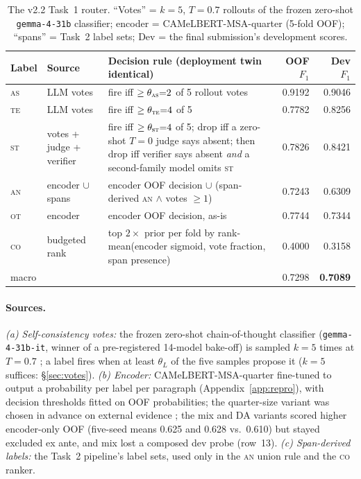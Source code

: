 \documentclass[11pt]{article}
\newcommand{\lab}[1]{\textsc{#1}}
\newcommand{\co}{\lab{co}}
\newcommand{\as}{\lab{as}}
\newcommand{\te}{\lab{te}}
\newcommand{\st}{\lab{st}}
\newcommand{\an}{\lab{an}}
\newcommand{\ot}{\lab{ot}}
\begin{document}
\begin{table}[t]
\centering\tiny
\setlength{\tabcolsep}{4pt}
\begin{tabular}{llp{7.2cm}rr}
\toprule
Label & Source & Decision rule (deployment twin identical) & OOF $F_1$ & Dev $F_1$ \\
\midrule
\as & LLM votes & fire iff $\geq\theta_{\as}{=}2$ of 5 rollout votes & 0.9192 & 0.9046 \\
\te & LLM votes & fire iff $\geq\theta_{\te}{=}4$ of 5 & 0.7782 & 0.8256 \\
\st & votes + judge + verifier & fire iff $\geq\theta_{\st}{=}4$ of 5; drop iff a zero-shot $T{=}0$ judge says absent; then drop iff verifier says absent \emph{and} a second-family model omits \st & 0.7826 & 0.8421 \\
\an & encoder $\cup$ spans & encoder OOF decision $\cup$ (span-derived \an{} $\wedge$ votes $\geq 1$) & 0.7243 & 0.6309 \\
\ot & encoder & encoder OOF decision, as-is & 0.7744 & 0.7344 \\
\co & budgeted rank & top $2\times$ prior per fold by rank-mean(encoder sigmoid, vote fraction, span presence) & 0.4000 & 0.3158 \\
\midrule
macro & & & 0.7298 & \textbf{0.7089} \\
\bottomrule
\end{tabular}
\caption{The v2.2 Task~1 router. ``Votes'' = $k{=}5$, $T{=}0.7$ rollouts
of the frozen zero-shot \texttt{gemma-4-31b} classifier; encoder =
CAMeLBERT-MSA-quarter (5-fold OOF); ``spans'' = Task~2 label sets; Dev =
the final submission's development scores.}
\label{tab:router}
\end{table}

\paragraph{Sources.} \emph{(a) Self-consistency votes:} the frozen
zero-shot chain-of-thought classifier (\texttt{gemma-4-31b-it}, winner
of a pre-registered 14-model bake-off) is sampled $k{=}5$ times at
$T{=}0.7$ \citep{wang-etal-2023-selfconsistency}; a label fires when at
least $\theta_L$ of the five samples propose it ($k{=}5$ suffices:
\S\ref{sec:votes}). \emph{(b) Encoder:} CAMeLBERT-MSA-quarter
\citep{inoue-etal-2021-camelbert} fine-tuned to output a probability per
label per paragraph (Appendix~\ref{app:repro}), with decision thresholds
fitted on OOF probabilities; the quarter-size variant was chosen in
advance on external evidence \citep{alzawqari-etal-2025-neural}; the
mix and DA variants scored higher encoder-only OOF (five-seed means
0.625 and 0.628 vs.\ 0.610) but stayed excluded ex ante, and mix lost
a composed dev probe (row~13).
\emph{(c) Span-derived labels:} the Task~2 pipeline's label sets, used
only in the \an{} union rule and the \co{} ranker.
\end{document}
